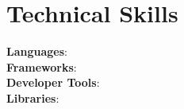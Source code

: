 \documentclass[11pt]{article}
\begin{document}
%
\section{Technical Skills}
 \begin{itemize}[leftmargin=0.15in, label={}]
    \small{\item{
     \textbf{Languages}: {} \\
     \textbf{Frameworks}: {} \\
     \textbf{Developer Tools}: {} \\
     \textbf{Libraries}: {}
    }}
 \end{itemize}


\end{document}
